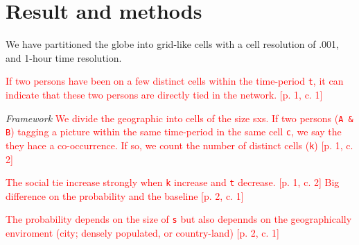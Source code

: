 \section{Result and methods}
We have partitioned the globe into grid-like cells with a cell resolution of .001\degree, and 1-hour time resolution. 

\textcolor{red}{If two persons have been on a few distinct cells within the time-period \texttt{t}, it can indicate that these two persons are directly tied in the network. [p. 1, c. 1]}

\textit{Framework}
\textcolor{red}{We divide the geographic into cells of the size sxs. 
If two persons (\texttt{A \& B}) tagging a picture within the same time-period in the same cell \texttt{c}, we say the they hace a co-occurrence. If so, we count the number of distinct cells (\texttt{k}) [p. 1, c. 2]}


\textcolor{red}{The social tie increase strongly when \texttt{k} increase and \texttt{t} decrease. [p. 1, c. 2]
Big difference on the probability and the baseline [p. 2, c. 1]}

\textcolor{red}{The probability depends on the size of \texttt{s} but also depennds on the geographically enviroment (city; densely populated, or country-land) [p. 2, c. 1]}